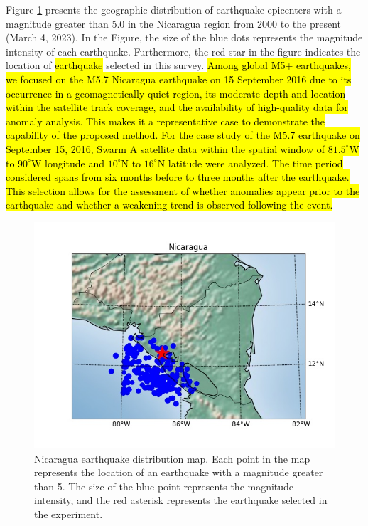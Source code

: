 \documentclass[3p,authoryear,preprint,12pt]{elsarticle}
\begin{document}
Figure \ref{fig:nicaragua} presents {the geographic distribution of earthquake epicenters} with a magnitude greater than 5.0 in the Nicaragua region from 2000 to the present (March 4, 2023). In the {Figure}, the size of the blue dots represents the magnitude intensity of each earthquake. Furthermore, the red {star} in the figure indicates the location of {\hl{earthquake} selected in this survey}. \hl{Among global M5+ earthquakes, we focused on the M5.7 Nicaragua earthquake on 15 September 2016 due to its occurrence in a geomagnetically quiet region, its moderate depth and location within the satellite track coverage, and the availability of high-quality data for anomaly analysis. This makes it a representative case to demonstrate the capability of the proposed method. For the case study of the M5.7 earthquake on September 15, 2016, Swarm A satellite data within the spatial window of $81.5^\circ$W to $90^\circ$W longitude and $10^\circ$N to $16^\circ$N latitude were analyzed. The time period considered spans from six months before to three months after the earthquake. This selection allows for the assessment of whether anomalies appear prior to the earthquake and whether a weakening trend is observed following the event.}
\begin{figure}[htbp]
	\centering
	\includegraphics[width=0.8\linewidth]{Nicaragua_1990-01-01-2024-01-01}
	\caption{{Nicaragua earthquake distribution map. Each point in the map represents the location of an earthquake with a magnitude greater than 5. The size of the blue point represents the magnitude intensity, and the red asterisk represents the earthquake selected in the experiment.}}
	\label{fig:nicaragua}
\end{figure}
\end{document}
